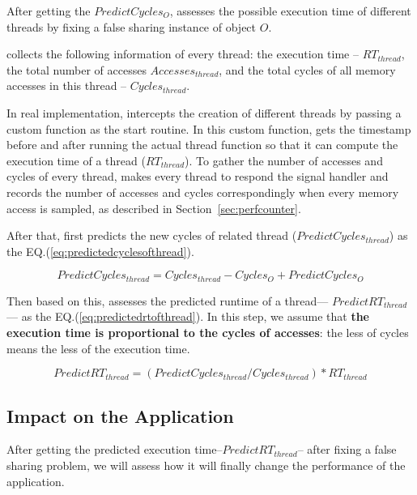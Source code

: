 After getting the $PredictCycles_{O}$, \cheetah{} assesses the possible execution time of different threads by fixing a false sharing instance of object $O$. 

\Cheetah{} collects the following information of every thread: the execution time -- $RT_{thread}$, the total number of accesses $Accesses_{thread}$, and the total cycles of all memory accesses in this thread -- $Cycles_{thread}$.

In real implementation, \cheetah{} intercepts the creation of different threads by passing a custom function as the start routine. In this custom function, \cheetah{} gets the timestamp before and after running the actual thread function so that it can compute the execution time of a thread ($RT_{thread}$). To gather the number of accesses and cycles of every thread, \cheetah{} makes every thread to respond the signal handler and records the number of accesses and cycles correspondingly when every memory access is sampled, as described in Section~\ref{sec:perfcounter}. 

After that, \cheetah{} first predicts the new cycles of related thread ($PredictCycles_{thread}$) as the EQ.(\ref{eq:predictedcyclesofthread}).

\begin{equation}
\label{eq:predictedcyclesofthread}
 PredictCycles_{thread} = Cycles_{thread} - Cycles_{O} + PredictCycles_{O} 
\end{equation} 
 

Then based on this, \cheetah{} assesses the predicted runtime of a thread--- $PredictRT_{thread}$--- as the EQ.(\ref{eq:predictedrtofthread}). In this step, we assume that {\bf the execution time is proportional to the cycles of accesses}: the less of cycles means the less of the execution time.  

\begin{equation}
\label{eq:predictedrtofthread}
 PredictRT_{thread} = (PredictCycles_{thread}/Cycles_{thread}) * RT_{thread} 
\end{equation} 

\subsection{Impact on the Application}
\label{sec:impactapp}

After getting the predicted execution time--$PredictRT_{thread}$-- after fixing a false sharing problem, we will assess how it will finally change the performance of the application. 


